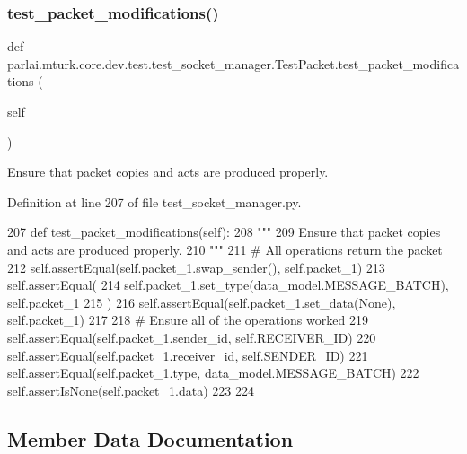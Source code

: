 \subsubsection{\texorpdfstring{test\+\_\+packet\+\_\+modifications()}{test\_packet\_modifications()}}
{\footnotesize\ttfamily def parlai.\+mturk.\+core.\+dev.\+test.\+test\+\_\+socket\+\_\+manager.\+Test\+Packet.\+test\+\_\+packet\+\_\+modifications (\begin{DoxyParamCaption}\item[{}]{self }\end{DoxyParamCaption})}

\begin{DoxyVerb}Ensure that packet copies and acts are produced properly.
\end{DoxyVerb}
 

Definition at line 207 of file test\+\_\+socket\+\_\+manager.\+py.


\begin{DoxyCode}
207     \textcolor{keyword}{def }test\_packet\_modifications(self):
208         \textcolor{stringliteral}{"""}
209 \textcolor{stringliteral}{        Ensure that packet copies and acts are produced properly.}
210 \textcolor{stringliteral}{        """}
211         \textcolor{comment}{# All operations return the packet}
212         self.assertEqual(self.packet\_1.swap\_sender(), self.packet\_1)
213         self.assertEqual(
214             self.packet\_1.set\_type(data\_model.MESSAGE\_BATCH), self.packet\_1
215         )
216         self.assertEqual(self.packet\_1.set\_data(\textcolor{keywordtype}{None}), self.packet\_1)
217 
218         \textcolor{comment}{# Ensure all of the operations worked}
219         self.assertEqual(self.packet\_1.sender\_id, self.RECEIVER\_ID)
220         self.assertEqual(self.packet\_1.receiver\_id, self.SENDER\_ID)
221         self.assertEqual(self.packet\_1.type, data\_model.MESSAGE\_BATCH)
222         self.assertIsNone(self.packet\_1.data)
223 
224 
\end{DoxyCode}


\subsection{Member Data Documentation}
\mbox{\label{classparlai_1_1mturk_1_1core_1_1dev_1_1test_1_1test__socket__manager_1_1TestPacket_a5b888cd6c3c978a1fdf623fd2e91ab66}} 
